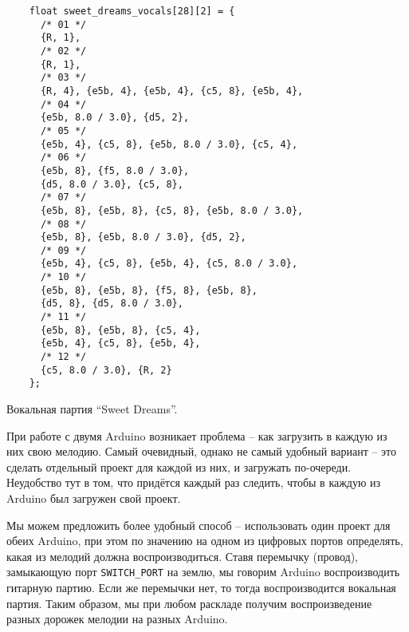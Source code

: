 \documentclass[../sparc.tex]{subfiles}
\begin{document}
\begin{listing}[!h]
  \begin{verbatim}
    float sweet_dreams_vocals[28][2] = {
      /* 01 */
      {R, 1},
      /* 02 */
      {R, 1},
      /* 03 */
      {R, 4}, {e5b, 4}, {e5b, 4}, {c5, 8}, {e5b, 4},
      /* 04 */
      {e5b, 8.0 / 3.0}, {d5, 2},
      /* 05 */
      {e5b, 4}, {c5, 8}, {e5b, 8.0 / 3.0}, {c5, 4},
      /* 06 */
      {e5b, 8}, {f5, 8.0 / 3.0},
      {d5, 8.0 / 3.0}, {c5, 8},
      /* 07 */
      {e5b, 8}, {e5b, 8}, {c5, 8}, {e5b, 8.0 / 3.0},
      /* 08 */
      {e5b, 8}, {e5b, 8.0 / 3.0}, {d5, 2},
      /* 09 */
      {e5b, 4}, {c5, 8}, {e5b, 4}, {c5, 8.0 / 3.0},
      /* 10 */
      {e5b, 8}, {e5b, 8}, {f5, 8}, {e5b, 8},
      {d5, 8}, {d5, 8.0 / 3.0},
      /* 11 */
      {e5b, 8}, {e5b, 8}, {c5, 4},
      {e5b, 4}, {c5, 8}, {e5b, 4},
      /* 12 */
      {c5, 8.0 / 3.0}, {R, 2}
    };
  \end{verbatim}
  \label{listing:music-band-sweet-dreams-2}
  \caption{Вокальная партия ``Sweet Dreams''.}
\end{listing}

При работе с двумя Arduino возникает проблема -- как загрузить в каждую из них
свою мелодию.  Самый очевидный, однако не самый удобный вариант -- это сделать
отдельный проект для каждой из них, и загружать по-очереди.  Неудобство тут в
том, что придётся каждый раз следить, чтобы в каждую из Arduino был загружен
свой проект.

Мы можем предложить более удобный способ -- использовать один проект для обеих
Arduino, при этом по значению на одном из цифровых портов определять, какая из
мелодий должна воспроизводиться.  Ставя перемычку (провод), замыкающую порт
\texttt{SWITCH\_PORT} на землю, мы говорим Arduino воспроизводить гитарную
партию.  Если же перемычки нет, то тогда воспроизводится вокальная партия.
Таким образом, мы при любом раскладе получим воспроизведение разных дорожек
мелодии на разных Arduino.
\end{document}
